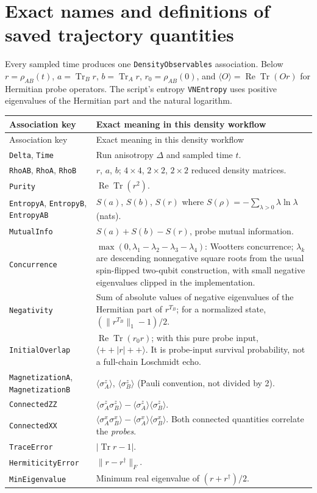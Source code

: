 \documentclass[10pt,a4paper]{article}
\newcommand{\code}[1]{\texttt{#1}}
\begin{document}
\section{Exact names and definitions of saved trajectory quantities}
\enlargethispage{3\baselineskip}
Every sampled time produces one \code{DensityObservables} association. Below $r=\rho_{AB}(t)$, $a=\operatorname{Tr}_B r$, $b=\operatorname{Tr}_A r$, $r_0=\rho_{AB}(0)$, and $\langle O\rangle=\operatorname{Re}\operatorname{Tr}(Or)$ for Hermitian probe operators. The script's entropy \code{VNEntropy} uses positive eigenvalues of the Hermitian part and the natural logarithm.
\begin{center}\small
\begin{longtable}{@{}p{43mm}p{113mm}@{}}
\toprule
Association key & Exact meaning in this density workflow\\\midrule
\endfirsthead
\toprule Association key & Exact meaning in this density workflow\\\midrule\endhead
\code{Delta}, \code{Time} & Run anisotropy $\Delta$ and sampled time $t$.\\
\code{RhoAB}, \code{RhoA}, \code{RhoB} & $r$, $a$, $b$; $4\times4$, $2\times2$, $2\times2$ reduced density matrices.\\
\code{Purity} & $\operatorname{Re}\operatorname{Tr}(r^2)$.\\
\code{EntropyA}, \code{EntropyB}, \code{EntropyAB} & $S(a)$, $S(b)$, $S(r)$ where $S(\rho)=-\sum_{\lambda>0}\lambda\ln\lambda$ (nats).\\
\code{MutualInfo} & $S(a)+S(b)-S(r)$, probe mutual information.\\
\code{Concurrence} & $\max(0,\lambda_1-\lambda_2-\lambda_3-\lambda_4)$: Wootters concurrence; $\lambda_k$ are descending nonnegative square roots from the usual spin-flipped two-qubit construction, with small negative eigenvalues clipped in the implementation.\\
\code{Negativity} & Sum of absolute values of negative eigenvalues of the Hermitian part of $r^{T_B}$; for a normalized state, $(\|r^{T_B}\|_1-1)/2$.\\
\code{InitialOverlap} & $\operatorname{Re}\operatorname{Tr}(r_0r)$; with this pure probe input, $\langle++|r|++\rangle$. It is probe-input survival probability, not a full-chain Loschmidt echo.\\
\code{MagnetizationA}, \code{MagnetizationB} & $\langle \sigma_A^z\rangle$, $\langle \sigma_B^z\rangle$ (Pauli convention, not divided by 2).\\
\code{ConnectedZZ} & $\langle \sigma_A^z\sigma_B^z\rangle-\langle \sigma_A^z\rangle\langle \sigma_B^z\rangle$.\\
\code{ConnectedXX} & $\langle \sigma_A^x\sigma_B^x\rangle-\langle \sigma_A^x\rangle\langle \sigma_B^x\rangle$. Both connected quantities correlate the \emph{probes}.\\
\code{TraceError} & $|\operatorname{Tr}r-1|$.\\
\code{HermiticityError} & $\|r-r^\dagger\|_F$.\\
\code{MinEigenvalue} & Minimum real eigenvalue of $(r+r^\dagger)/2$.\\
\bottomrule
\end{longtable}
\end{center}
\end{document}
